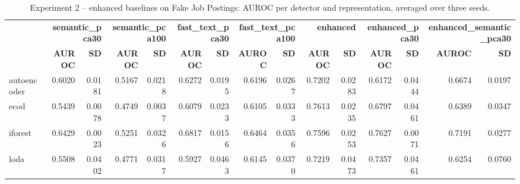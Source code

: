 \begin{table}
\centering
\caption{Experiment 2 -- enhanced baselines on Fake Job Postings: AUROC per detector and representation, averaged over three seeds.}
\label{tab:exp2_auroc_fake_jobs}
\begin{tabular}{lrrrrrrrrrrrrrr}
\toprule
 & \multicolumn{2}{r}{\bfseries semantic\_pca30} & \multicolumn{2}{r}{\bfseries semantic\_pca100} & \multicolumn{2}{r}{\bfseries fast\_text\_pca30} & \multicolumn{2}{r}{\bfseries fast\_text\_pca100} & \multicolumn{2}{r}{\bfseries enhanced} & \multicolumn{2}{r}{\bfseries enhanced\_pca30} & \multicolumn{2}{r}{\bfseries enhanced\_semantic\_pca30} \\
 & \bfseries AUROC & \bfseries SD & \bfseries AUROC & \bfseries SD & \bfseries AUROC & \bfseries SD & \bfseries AUROC & \bfseries SD & \bfseries AUROC & \bfseries SD & \bfseries AUROC & \bfseries SD & \bfseries AUROC & \bfseries SD \\
\midrule
autoencoder & 0.6020 & 0.0181 & 0.5167 & 0.0218 & 0.6272 & 0.0195 & 0.6196 & 0.0267 & 0.7202 & 0.0283 & 0.6172 & 0.0444 & 0.6674 & 0.0197 \\
ecod & 0.5439 & 0.0078 & 0.4749 & 0.0037 & 0.6079 & 0.0233 & 0.6105 & 0.0333 & 0.7613 & 0.0235 & 0.6797 & 0.0461 & 0.6389 & 0.0347 \\
iforest & 0.6429 & 0.0023 & 0.5251 & 0.0326 & 0.6817 & 0.0156 & 0.6464 & 0.0356 & 0.7596 & 0.0253 & 0.7627 & 0.0071 & 0.7191 & 0.0277 \\
loda & 0.5508 & 0.0402 & 0.4771 & 0.0317 & 0.5927 & 0.0463 & 0.6145 & 0.0370 & 0.7219 & 0.0473 & 0.7357 & 0.0461 & 0.6254 & 0.0760 \\
\bottomrule
\end{tabular}
\end{table}
